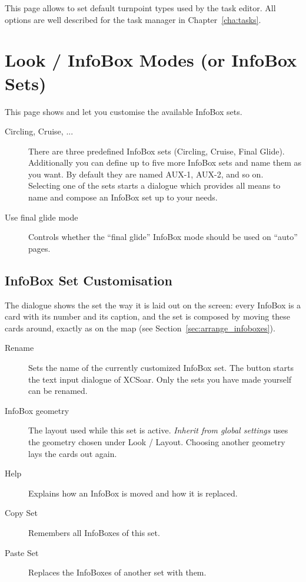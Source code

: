 This page allows to set default turnpoint types used by the task editor. All 
options are well described for the task manager in Chapter~\ref{cha:tasks}.


\section{Look / InfoBox Modes (or InfoBox Sets)}\label{sec:infobox_sets}
\label{conf:infobox_sets}

This page shows and let you customise the available InfoBox sets.

\begin{description}
\item[Circling, Cruise, ...]  There are three predefined InfoBox sets (Circling, Cruise, Final Glide). 
  Additionally you can define up to five more InfoBox sets and name them as you want.   
  By default they are named AUX-1, AUX-2, and so on. \\
  Selecting one of the sets starts a dialogue which provides all means to name and 
  compose an InfoBox set up to your needs.

\item[Use final glide mode]  Controls whether the ``final glide'' InfoBox mode should be used on ``auto'' pages.
\end{description}

\subsection*{InfoBox Set Customisation}

The dialogue shows the set the way it is laid out on the screen: every
InfoBox is a card with its number and its caption, and the set is
composed by moving these cards around, exactly as on the map (see
Section~\ref{sec:arrange_infoboxes}).

\begin{description}
\item[Rename]  Sets the name of the currently customized InfoBox set.
  The button starts the text input dialogue of XCSoar. Only the sets
  you have made yourself can be renamed.
\item[InfoBox geometry]  The layout used while this set is active.
  \emph{Inherit from global settings} uses the geometry chosen under
  Look / Layout.  Choosing another geometry lays the cards out again.
\item[Help]  Explains how an InfoBox is moved and how it is replaced.
\item[Copy Set]  Remembers all InfoBoxes of this set.
\item[Paste Set]  Replaces the InfoBoxes of another set with them.
\end{description}

